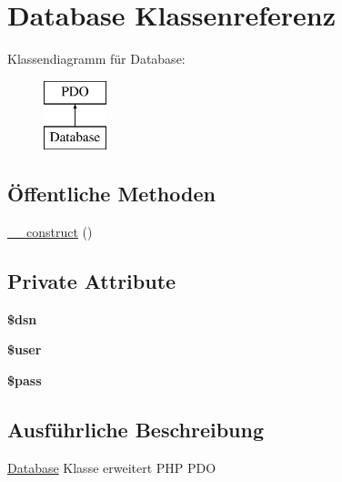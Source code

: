 \hypertarget{class_database}{\section{Database Klassenreferenz}
\label{class_database}
}
Klassendiagramm für Database\-:\begin{figure}[H]
\begin{center}
\leavevmode
\includegraphics[height=2.000000cm]{class_database}
\end{center}
\end{figure}
\subsection*{Öffentliche Methoden}
\begin{DoxyCompactItemize}
\item 
\hyperlink{class_database_a2852f635197e76a838486e64e00aac9f}{\-\_\-\-\_\-construct} ()
\end{DoxyCompactItemize}
\subsection*{Private Attribute}
\begin{DoxyCompactItemize}
\item 
\hypertarget{class_database_acf4bc044b7d1c3e54536ea4f2b0da56a}{{\bfseries \$dsn}}\label{class_database_acf4bc044b7d1c3e54536ea4f2b0da56a}

\item 
\hypertarget{class_database_ae9e43fb2a274428ec75ae70be7ab045f}{{\bfseries \$user}}\label{class_database_ae9e43fb2a274428ec75ae70be7ab045f}

\item 
\hypertarget{class_database_a8783a2890064e9d86b48a55fa09432f5}{{\bfseries \$pass}}\label{class_database_a8783a2890064e9d86b48a55fa09432f5}

\end{DoxyCompactItemize}


\subsection{Ausführliche Beschreibung}
\hyperlink{class_database}{Database} Klasse erweitert P\-H\-P P\-D\-O

